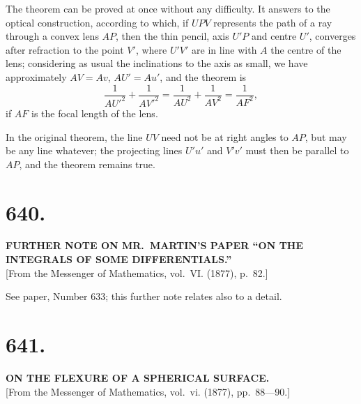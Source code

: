 \documentclass[12pt,a4paper]{article}
\theoremstyle{plain}
\theoremstyle{definition}
\theoremstyle{remark}
\begin{document}
The theorem can be proved at once without any difficulty. It answers to the optical construction, according to which, if $UPV$ represents the path of a ray through a convex lens $AP$, then the thin pencil, axis $U'P$ and centre $U'$, converges after refraction to the point $V'$, where $U'V'$ are in line with $A$ the centre of the lens; considering as usual the inclinations to the axis as small, we have approximately $AV = Av$, $AU' = Au'$, and the theorem is
\[
\frac{1}{AU'^2} + \frac{1}{AV'^2} = \frac{1}{AU^2} + \frac{1}{AV^2} = \frac{1}{AF^2},
\]
if $AF$ is the focal length of the lens.

In the original theorem, the line $UV$ need not be at right angles to $AP$, but may be any line whatever; the projecting lines $U'u'$ and $V'v'$ must then be parallel to $AP$, and the theorem remains true.

\clearpage
\setcounter{page}{29}

\section*{640.}

\begin{center}
\textbf{FURTHER NOTE ON MR.~MARTIN'S PAPER ``ON THE INTEGRALS OF SOME DIFFERENTIALS.''}\\[1em]
[From the Messenger of Mathematics, vol.~VI. (1877), p.~82.]
\end{center}

See paper, Number 633; this further note relates also to a detail.

\clearpage
\setcounter{page}{30}

\section*{641.}

\begin{center}
\textbf{ON THE FLEXURE OF A SPHERICAL SURFACE.}\\[1em]
[From the Messenger of Mathematics, vol.~vi. (1877), pp.~88---90.]
\end{center}
\end{document}
